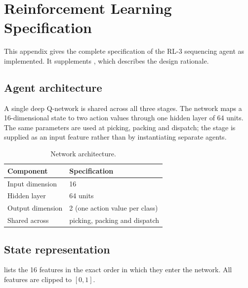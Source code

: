 \chapter{Reinforcement Learning Specification}
\label{app:C}

This appendix gives the complete specification of the RL-3 sequencing agent as implemented. It
supplements , which describes the design rationale.

\section{Agent architecture}

A single deep Q-network \citep{mnih2015} is shared across all three stages. The network maps a
16-dimensional state to two action values through one hidden layer of 64 units. The same
parameters are used at picking, packing and dispatch; the stage is supplied as an input feature
rather than by instantiating separate agents.

\begin{table}[htbp]
\centering
\caption{Network architecture.}
\label{tab:rl-network}
\small
\begin{tabularx}{0.85\textwidth}{lX}
\toprule
\textbf{Component} & \textbf{Specification} \\
\midrule
Input dimension  & 16 \\
Hidden layer     & 64 units \\
Output dimension & 2 (one action value per class) \\
Shared across    & picking, packing and dispatch \\
\bottomrule
\end{tabularx}
\end{table}

\section{State representation}

 lists the 16 features in the exact order in which they enter the network.
All features are clipped to \([0,1]\).

